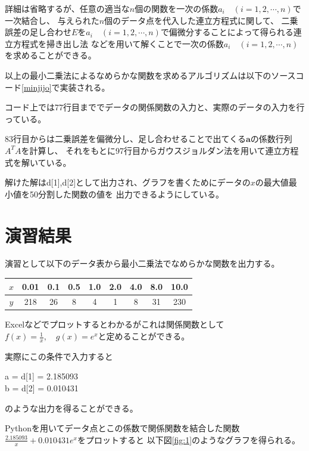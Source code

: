 \documentclass[a4paper,11pt,dvipdfmx]{jsarticle}
\begin{document}
詳細は省略するが、任意の適当な$n$個の関数を一次の係数$a_i \quad(i=1,2,\cdots,n)$で一次結合し、
与えられた$n$個のデータ点を代入した連立方程式に関して、
二乗誤差の足し合わせ$E$を$a_i \quad(i=1,2,\cdots,n)$で偏微分することによって得られる連立方程式を掃き出し法
などを用いて解くことで一次の係数$a_i \quad(i=1,2,\cdots,n)$を求めることができる。

以上の最小二乗法によるなめらかな関数を求めるアルゴリズムは以下のソースコード\ref{minjijo}で実装される。


コード上では77行目まででデータの関係関数の入力と、実際のデータの入力を行っている。

83行目からは二乗誤差を偏微分し、足し合わせることで出てくる$\textbf{a}$の係数行列$A^TA$を計算し、
それをもとに97行目からガウスジョルダン法を用いて連立方程式を解いている。

解けた解はd[1],d[2]として出力され、グラフを書くためにデータの$x$の最大値最小値を50分割した関数の値を
出力できるようにしている。

\section{演習結果}
演習として以下のデータ表から最小二乗法でなめらかな関数を出力する。
\begin{center}
    \begin{tabular}[h]{|c|c|c|c|c|c|c|c|c|} \hline
         $x$  & 0.01 & 0.1 & 0.5 & 1.0 & 2.0 & 4.0 & 8.0 & 10.0 \\ \hline
         $y$  & 218  & 26  &  8  &  4  &  1  &  8  &  31 &  230 \\ \hline
    \end{tabular}
\end{center}

Excelなどでプロットするとわかるがこれは関係関数として$f(x)=\frac{1}{x},\quad g(x)=e^x$と定めることができる。

実際にこの条件で入力すると
\begin{shaded}
    \noindent
    \centering
    a = d[1] = 2.185093\\
    b = d[2] = 0.010431
\end{shaded}
のような出力を得ることができる。

Pythonを用いてデータ点とこの係数で関係関数を結合した関数$\frac{2.185093}{x}+0.010431e^x$をプロットすると
以下図\ref{fig:1}のようなグラフを得られる。
\end{document}
